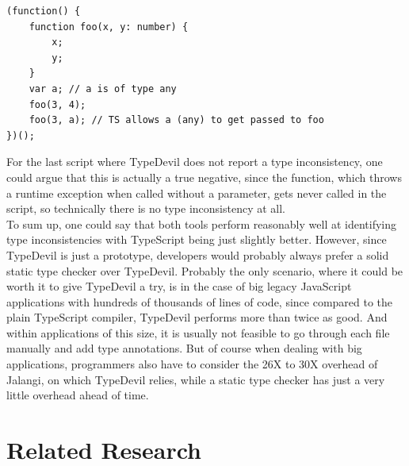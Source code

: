 \documentclass[runningheads,a4paper]{llncs}
\begin{document}
\medskip\medskip
\lstset{language=javascript}
\begin{minipage}{\linewidth}
\begin{lstlisting}[frame=single, caption=Inconsistent Function Args , label={lst:InconsistentFunctionArgs}]
(function() {
    function foo(x, y: number) {
        x;
        y;
    } 
    var a; // a is of type any
    foo(3, 4);
    foo(3, a); // TS allows a (any) to get passed to foo
})();
\end{lstlisting}
\end{minipage}
For the last script where TypeDevil does not report a type inconsistency, one could argue that this is actually a true negative, since the function, which throws a runtime exception when called without a parameter, gets never called in the script, so technically there is no type inconsistency at all.\\
To sum up, one could say that both tools perform reasonably well at identifying type inconsistencies with TypeScript being just slightly better.
However, since TypeDevil is just a prototype, developers would probably always prefer a solid static type checker over TypeDevil.
Probably the only scenario, where it could be worth it to give TypeDevil a try, is in the case of big legacy JavaScript applications with hundreds of thousands of lines of code, since compared to the plain TypeScript compiler, TypeDevil performs more than twice as good.
And within applications of this size, it is usually not feasible to go through each file manually and add type annotations. 
But of course when dealing with big applications, programmers also have to consider the 26X to 30X overhead of Jalangi, on which TypeDevil relies, while a static type checker has just a very little overhead ahead of time.


\newpage

\section{Related Research}
\end{document}
